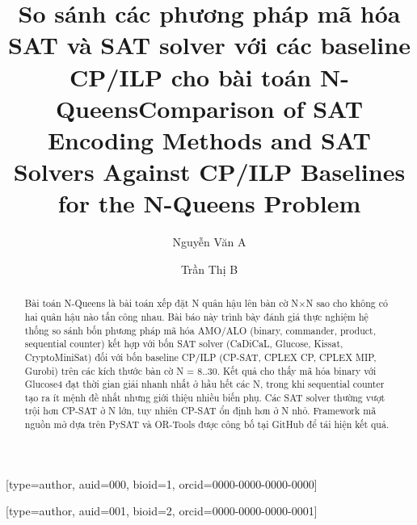 \documentclass[a4paper,fleqn]{cas-sc}
\begin{document}
\let\WriteBookmarks\relax
\def\floatpagepagefraction{1}
\def\textpagefraction{.001}


\title[mode=title]{So sánh các phương pháp mã hóa SAT và SAT solver với các baseline CP/ILP cho bài toán N-Queens}

\title[mode=title,english]{Comparison of SAT Encoding Methods and SAT Solvers Against CP/ILP Baselines for the N-Queens Problem}

\author{Nguyễn Văn A}[type=author,
  auid=000,
  bioid=1,
  orcid=0000-0000-0000-0000]

\author{Trần Thị B}[type=author,
  auid=001,
  bioid=2,
  orcid=0000-0000-0000-0001]

\cormark[1]

\fnmark[1]




\begin{abstract}
Bài toán N-Queens là bài toán xếp đặt N quân hậu lên bàn cờ N$\times$N sao cho không có hai quân hậu nào tấn công nhau. Bài báo này trình bày đánh giá thực nghiệm hệ thống so sánh bốn phương pháp mã hóa AMO/ALO (binary, commander, product, sequential counter) kết hợp với bốn SAT solver (CaDiCaL, Glucose, Kissat, CryptoMiniSat) đối với bốn baseline CP/ILP (CP-SAT, CPLEX CP, CPLEX MIP, Gurobi) trên các kích thước bàn cờ N = 8..30. Kết quả cho thấy mã hóa binary với Glucose4 đạt thời gian giải nhanh nhất ở hầu hết các N, trong khi sequential counter tạo ra ít mệnh đề nhất nhưng giới thiệu nhiều biến phụ. Các SAT solver thường vượt trội hơn CP-SAT ở N lớn, tuy nhiên CP-SAT ổn định hơn ở N nhỏ. Framework mã nguồn mở dựa trên PySAT và OR-Tools được công bố tại GitHub để tái hiện kết quả.

\end{abstract}
\end{document}
